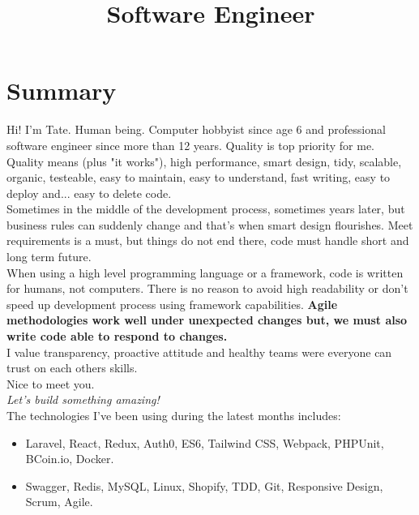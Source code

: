 \documentclass[11pt,a4paper,sans]{moderncv}        %
\title{Software Engineer}                               %
\begin{document}
\makecvtitle

\section{Summary}

Hi! I’m Tate. Human being. Computer hobbyist since age 6 and professional software engineer since more than 12 years.
Quality is top priority for me. Quality means (plus "it works"), high performance, smart design, tidy, scalable, organic, testeable, easy to maintain, easy to understand, fast writing, easy to deploy and... easy to delete code.\\

Sometimes in the middle of the development process, sometimes years later, but business rules can suddenly change and that's when smart design flourishes.
Meet requirements is a must, but things do not end there, code must handle short and long term future.\\

When using a high level programming language or a framework, code is written for humans, not computers. There is no reason to avoid high readability or don't speed up development process using framework capabilities.
\textbf{Agile methodologies work well under unexpected changes but, we must also write code able to respond to changes.}\\

I value transparency, proactive attitude and healthy teams were everyone can trust on each others skills.\\

Nice to meet you.\\
\textit{Let's build something amazing!}\\

\medskip The technologies I've been using during the latest months includes:
\begin{itemize}
  \item Laravel, React, Redux, Auth0, ES6, Tailwind CSS, Webpack, PHPUnit, BCoin.io, Docker.
  \item Swagger, Redis, MySQL, Linux, Shopify, TDD, Git, Responsive Design, Scrum, Agile.
\end{itemize}

\clearpage
\end{document}

